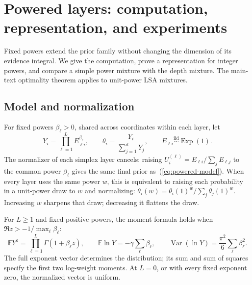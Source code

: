 \documentclass[anon]{alt2027}
\newcommand{\Exp}{\operatorname{Exp}}
\newcommand{\E}{\mathbb{E}}
\renewcommand{\eqref}[1]{(\ref{#1})}
\begin{document}
\section{Powered layers: computation, representation, and experiments}
\label{app:powers}

Fixed powers extend the prior family without changing the dimension of its evidence integral. We give the computation, prove a representation for integer powers, and compare a simple power mixture with the depth mixture. The main-text optimality theorem applies to unit-power LSA mixtures.

\subsection{Model and normalization}
For fixed powers $\beta_\ell>0$, shared across coordinates within each layer, let
\begin{equation}
Y_i=\prod_{\ell=1}^L E_{\ell i}^{\beta_\ell},\qquad
\theta_i=\frac{Y_i}{\sum_{j=1}^dY_j},\qquad
E_{\ell i}\stackrel{\mathrm{iid}}{\sim}\Exp(1).
\label{eq:powered-model}
\end{equation}
The normalizer of each simplex layer cancels: raising $U_i^{(\ell)}=E_{\ell i}/\sum_jE_{\ell j}$ to the common power $\beta_\ell$ gives the same final prior as~\eqref{eq:powered-model}. When every layer uses the same power $w$, this is equivalent to raising each probability in a unit-power draw to $w$ and normalizing: $\theta_i(w)=\theta_i(1)^w/\sum_j\theta_j(1)^w$. Increasing $w$ sharpens that draw; decreasing it flattens the draw.

For $L\ge1$ and fixed positive powers, the moment formula holds when $\Re z>-1/\max_\ell\beta_\ell$:
\begin{equation}
\E Y^z=\prod_{\ell=1}^L\Gamma(1+\beta_\ell z),\qquad
\E\ln Y=-\gamma\sum_\ell\beta_\ell,\qquad
\operatorname{Var}(\ln Y)=\frac{\pi^2}{6}\sum_\ell\beta_\ell^2.
\label{eq:powered-moments}
\end{equation}
The full exponent vector determines the distribution; its sum and sum of squares specify the first two log-weight moments. At $L=0$, or with every fixed exponent zero, the normalized vector is uniform.
\end{document}

